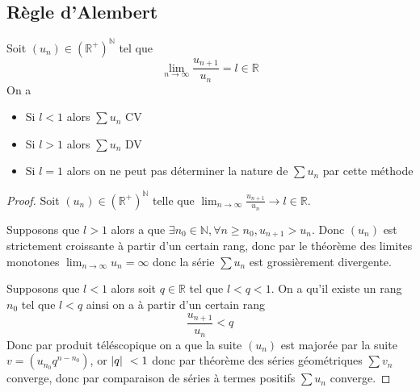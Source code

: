 \documentclass[11pt,colorlinks]{book}
\theoremstyle{mytheoremstyle}
\theoremstyle{mytheoremstyle}
\theoremstyle{mytheoremstyle}
\theoremstyle{mytheoremstyle}
\theoremstyle{mytheoremstyle}
\theoremstyle{mytheoremstyle}
\theoremstyle{mytheoremstyle}
\theoremstyle{mytheoremstyle}
\theoremstyle{myproblemstyle}
\def\mbb#1{\mathbb{#1}}
\def\bN{\mbb{N}}
\def\bR{\mbb{R}}
\def\ln{\lim_{n \to \infty}}
\def\rNp{\left(\bR^{+}\right)^{\bN}}
\def\apcr{à partir d'un certain rang}
\begin{document}
\subsection{Règle d'Alembert}
\begin{theorem}
  Soit $(u_n) \in \rNp$ tel que 
  \begin{equation*}
    \ln \frac{u_{n+1}}{u_n} = l \in \bR
  \end{equation*}
  On a 
  \begin{itemize}
    \item Si $l < 1$ alors $\sum u_n$ CV 
    \item Si $l > 1$ alors $\sum u_n$ DV 
    \item Si $l=1$ alors on ne peut pas déterminer la nature de $\sum u_n$ par cette méthode
  \end{itemize}
  \begin{proof}
    Soit $(u_n) \in \rNp$ telle que $\ln \frac{u_{n+1}}{u_{n}} \to l \in \bR$.\newline

    
    Supposons que $l > 1$ alors a que $\exists n_0 \in \bN, \forall n \geq n_0, u_{n+1} > u_{n}$. 
    Donc $(u_n)$ est strictement croissante \apcr, donc par le théorème des limites monotones $\ln u_n = \infty$ donc 
    la série $\sum u_n$ est grossièrement divergente.\newline


    Supposons que $l < 1$ alors soit $q \in \bR$ tel que $l < q < 1$. On a qu'il existe un rang $n_0$ tel que 
    $l < q$ ainsi on a \apcr
    \begin{equation*}
      \frac{u_{n+1}}{u_n} < q 
    \end{equation*}
    Donc par produit téléscopique on a que la suite $(u_n)$ est majorée par la suite $v = (u_{n_0}q^{n-n_0})$, 
    or $\abs{q} < 1$ donc par théorème des séries géométriques $\sum v_n$ converge, donc par comparaison de séries à termes 
    positifs $\sum u_n$ converge. 
  \end{proof}
\end{theorem}
\end{document}

